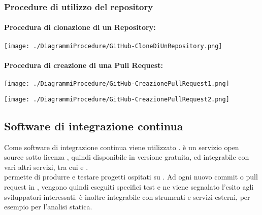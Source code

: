 \newpage
\subsubsection{Procedure di utilizzo del repository}

\paragraph{Procedura di clonazione di un Repository:}

\begin{center}
\texttt{[image: ./DiagrammiProcedure/GitHub-CloneDiUnRepository.png]}
\end{center}

\paragraph{Procedura di creazione di una Pull Request:}

\begin{center}
	\texttt{[image: ./DiagrammiProcedure/GitHub-CreazionePullRequest1.png]}
\end{center}


\begin{center}
	\texttt{[image: ./DiagrammiProcedure/GitHub-CreazionePullRequest2.png]}
\end{center}

\subsection{Software di integrazione continua}
Come software di integrazione continua viene utilizzato \textbf{}.
 è un servizio open source sotto licenza , quindi disponibile in versione gratuita,  ed integrabile con vari altri servizi, tra cui  e .\\  permette di produrre e testare progetti ospitati su . Ad ogni nuovo commit o pull request in , vengono quindi eseguiti specifici test e ne viene segnalato l'esito agli sviluppatori interessati.  è inoltre integrabile con strumenti e servizi esterni, per esempio per l'analisi statica.

